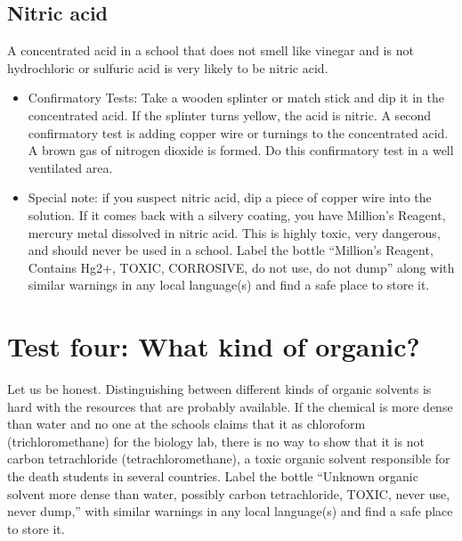 \subsection{Nitric acid}
A concentrated acid in a school that does not smell like vinegar 
and is not hydrochloric or sulfuric acid is very likely to be nitric acid. 

\begin{itemize}

\item{Confirmatory Tests: Take a wooden splinter 
or match stick and dip it in the concentrated acid. 
If the splinter turns yellow, 
the acid is nitric. 
A second confirmatory test is adding copper wire 
or turnings to the concentrated acid. 
A brown gas of nitrogen dioxide is formed. 
Do this confirmatory test in a well ventilated area.}

\item{Special note: if you suspect nitric acid, 
dip a piece of copper wire into the solution. 
If it comes back with a silvery coating, 
you have Million’s Reagent, 
mercury metal dissolved in nitric acid. 
This is highly toxic, 
very dangerous, 
and should never be used in a school. 
Label the bottle “Million’s Reagent, 
Contains Hg2+, 
TOXIC, 
CORROSIVE, 
do not use, 
do not dump” along with similar warnings 
in any local language(s) and find a safe place to store it.}

\end{itemize}

\section{Test four: What kind of organic?}

Let us be honest. 
Distinguishing between different kinds of organic solvents 
is hard with the resources that are probably available. 
If the chemical is more dense than water 
and no one at the schools claims that it as chloroform 
(trichloromethane) for the biology lab, 
there is no way to show that it is not carbon tetrachloride 
(tetrachloromethane), 
a toxic organic solvent responsible 
for the death students in several countries. 
Label the bottle “Unknown organic solvent more dense than water, 
possibly carbon tetrachloride, 
TOXIC, 
never use, 
never dump,” with similar warnings in any local language(s) 
and find a safe place to store it.

